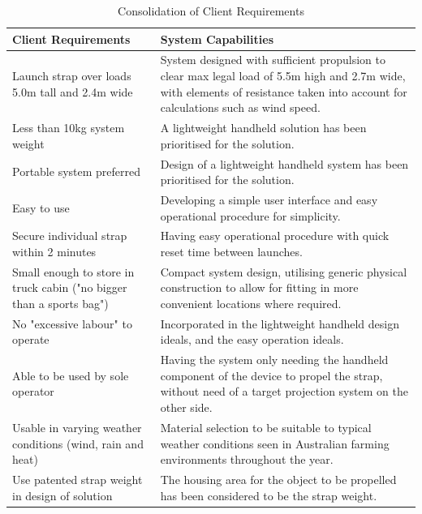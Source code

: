 \documentclass[a4paper,10pt]{article} %
\begin{document}
\begin{table}[h]
\caption{Consolidation of Client Requirements}
\centering
\renewcommand{\arraystretch}{1.4} %
\setlength{\tabcolsep}{6pt}       %
\begin{tabular}{
    |>{\centering\arraybackslash}m{}|
     >{\centering\arraybackslash}m{}|
}
\hline
\textbf{Client Requirements} & \textbf{System Capabilities} \\ \hline
Launch strap over loads 5.0m tall and 2.4m wide & System designed with sufficient propulsion to clear max legal load of 5.5m high and 2.7m wide, with elements of resistance taken into account for calculations such as wind speed. \\ \hline
Less than 10kg system weight & A lightweight handheld solution has been prioritised for the solution. \\ \hline
Portable system preferred & Design of a lightweight handheld system has been prioritised for the solution. \\ \hline
Easy to use & Developing a simple user interface and easy operational procedure for simplicity. \\ \hline
Secure individual strap within 2 minutes  & Having easy operational procedure with quick reset time between launches. \\ \hline
Small enough to store in truck cabin ("no bigger than a sports bag") & Compact system design, utilising generic physical construction to allow for fitting in more convenient locations where required. \\ \hline
No "excessive labour" to operate & Incorporated in the lightweight handheld design ideals, and the easy operation ideals. \\ \hline
Able to be used by sole operator & Having the system only needing the handheld component of the device to propel the strap, without need of a target projection system on the other side. \\ \hline
Usable in varying weather conditions (wind, rain and heat) & Material selection to be suitable to typical weather conditions seen in Australian farming environments throughout the year. \\ \hline
Use patented strap weight in design of solution &
The housing area for the object to be propelled has been considered to be the strap weight. \\ \hline
\end{tabular}
\label{tab:ClientRequirements}
\end{table}
\end{document}
